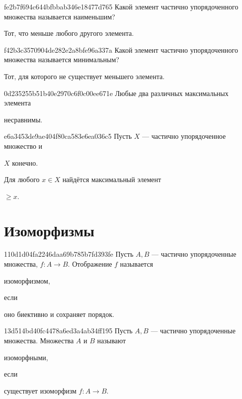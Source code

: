 \begin{note}{fe2b7f694c644bfbbab346e18477d765}
    Какой элемент частично упорядоченного множества называется наименьшим?

    \begin{cloze}{1}
        Тот, что меньше любого другого элемента.
    \end{cloze}
\end{note}

\begin{note}{f42b3c3570904de282e2a8bfe96a337a}
    Какой элемент частично упорядоченного множества называется минимальным?

    \begin{cloze}{1}
        Тот, для которого не существует меньшего элемента.
    \end{cloze}
\end{note}

\begin{note}{0d235255b51b40e2970c6f0c00ee671e}
    Любые два различных максимальных элемента \begin{icloze}{1}несравнимы.\end{icloze}
\end{note}

\begin{note}{e6a3453de9ae404f80ca583e6ea036c5}
    Пусть \({ X }\) --- частично упорядоченное множество и \begin{icloze}{2}\({ X }\) конечно.\end{icloze}
    Для любого \({ x \in X }\) найдётся максимальный элемент \begin{icloze}{1}\({ \geqslant x }\).\end{icloze}
\end{note}

\section{Изоморфизмы}
\begin{note}{110d1d04fa2246daa69b785b7fd393fe}
    Пусть \({ A, B }\) --- частично упорядоченные множества, \({ f : A \to B }\).
    Отображение \({ f }\) называется \begin{icloze}{2}изоморфизмом,\end{icloze} если \begin{icloze}{1}оно биективно и сохраняет порядок.\end{icloze}
\end{note}

\begin{note}{13d514bd40fc4478a6ed3a4ab34ff195}
    Пусть \({ A, B }\) --- частично упорядоченные множества.
    Множества \({ A }\) и \({ B }\) называют \begin{icloze}{2}изоморфными,\end{icloze} если \begin{icloze}{1}существует изоморфизм \({ f : A \to B }\).\end{icloze}
\end{note}

